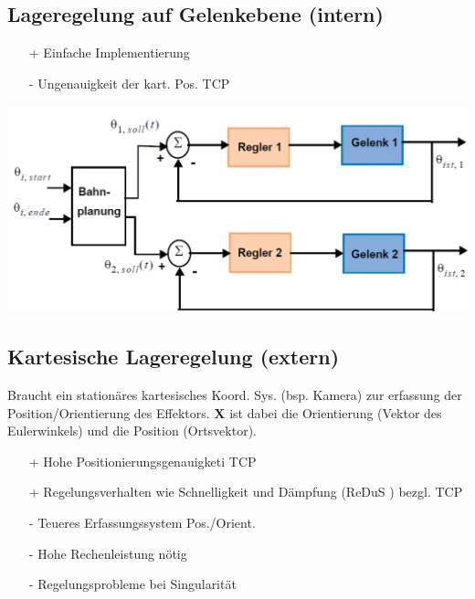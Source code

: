 \begin{minipage}{0.5\linewidth}
    \subsection{Lageregelung auf Gelenkebene (intern)}
        \begin{itemize}
            \item[+] Einfache Implementierung
            \item[-] Ungenauigkeit der kart. Pos. TCP
        \end{itemize}
\end{minipage}    
\begin{minipage}{0.5\linewidth}
    \includegraphics[width=\linewidth]{./bilder/LageregelungGelenk}
\end{minipage}    
\begin{minipage}{0.5\linewidth}
    \subsection{Kartesische Lageregelung (extern)}
    Braucht ein stationäres kartesisches Koord. Sys. (bsp. Kamera) zur erfassung der Position/Orientierung des Effektors. \textbf{X} ist dabei die Orientierung (Vektor des Eulerwinkels) und die Position (Ortsvektor).
    \begin{itemize}
        \item[+] Hohe Positionierungsgenauigketi TCP
        \item[+] Regelungsverhalten wie Schnelligkeit und Dämpfung (ReDuS ) bezgl. TCP
        \item[-] Teueres Erfassungssystem Pos./Orient.
        \item[-] Hohe Rechenleistung nötig
        \item[-] Regelungsprobleme bei Singularität
    \end{itemize}
    
\end{minipage}
